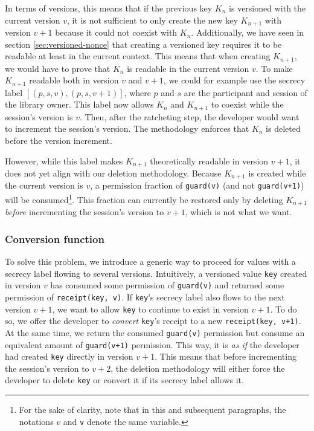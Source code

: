 In terms of versions, this means that if the previous key $K_n$ is versioned with the current version $v$, it is not sufficient to only create the new key $K_{n+1}$ with version $v+1$ because it could not coexist with $K_n$.
Additionally, we have seen in section \ref{sec:versioned-nonce} that creating a versioned key requires it to be readable at least in the current context. This means that when creating $K_{n+1}$, we would have to prove that $K_n$ is readable in the current version $v$. To make $K_{n+1}$ readable both in version $v$ and $v+1$, we could for example use the secrecy label $[(p,s,v), (p,s,v+1)]$, where $p$ and $s$ are the participant and session of the library owner.
This label now allows $K_n$ and $K_{n+1}$ to coexist while the session's version is $v$.
Then, after the ratcheting step, the developer would want to increment the session's version. The methodology enforces that $K_n$ is deleted before the version increment.

However, while this label makes $K_{n+1}$ theoretically readable in version $v+1$, it does not yet align with our deletion methodology. Because $K_{n+1}$ is created while the current version is $v$, a permission fraction of \texttt{guard(v)} (and not \texttt{guard(v+1)}) will be consumed\footnote{For the sake of clarity, note that in this and subsequent paragraphs, the notations $v$ and \texttt{v} denote the same variable.}. This fraction can currently be restored only by deleting $K_{n+1}$ \emph{before} incrementing the session's version to $v+1$, which is not what we want.

\subsubsection{Conversion function}
\label{sec:conversion-function}

To solve this problem, we introduce a generic way to proceed for values with a secrecy label flowing to several versions.
Intuitively, a versioned value \texttt{key} created in version $v$ has consumed some permission of \texttt{guard(v)} and returned some permission of \texttt{receipt(key, v)}.
If \texttt{key}'s secrecy label also flows to the next version $v+1$, we want to allow \texttt{key} to continue to exist in version $v+1$.
To do so, we offer the developer to \emph{convert} \texttt{key}'s receipt to a new \texttt{receipt(key, v+1)}. At the same time, we return the consumed \texttt{guard(v)} permission but consume an equivalent amount of \texttt{guard(v+1)} permission.
This way, it is \emph{as if} the developer had created \texttt{key} directly in version $v+1$.
This means that before incrementing the session's version to $v+2$, the deletion methodology will either force the developer to delete \texttt{key} or convert it if its secrecy label allows it.

